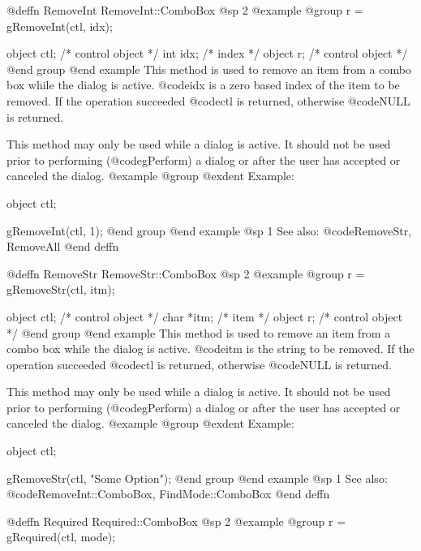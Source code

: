 {@deffn {RemoveInt} RemoveInt::ComboBox
@sp 2
@example
@group
r = gRemoveInt(ctl, idx);

object  ctl;    /*  control object  */
int     idx;    /*  index           */
object  r;      /*  control object  */
@end group
@end example
This method is used to remove an item from a combo box while the dialog
is active.  @code{idx} is a zero based index of the item to be removed.
If the operation succeeded @code{ctl} is returned, otherwise @code{NULL}
is returned.

This method may only be used while a dialog is active.  It should not be
used prior to performing (@code{gPerform}) a dialog or after the user
has accepted or canceled the dialog.
@example
@group
@exdent Example:

object  ctl;

gRemoveInt(ctl, 1);
@end group
@end example
@sp 1
See also:  @code{RemoveStr, RemoveAll}
@end deffn














@deffn {RemoveStr} RemoveStr::ComboBox
@sp 2
@example
@group
r = gRemoveStr(ctl, itm);

object  ctl;    /*  control object  */
char   *itm;    /*  item            */
object  r;      /*  control object  */
@end group
@end example
This method is used to remove an item from a combo box while the dialog
is active.  @code{itm} is the string to be removed.
If the operation succeeded @code{ctl} is returned, otherwise @code{NULL}
is returned.

This method may only be used while a dialog is active.  It should not be
used prior to performing (@code{gPerform}) a dialog or after the user
has accepted or canceled the dialog.
@example
@group
@exdent Example:

object  ctl;

gRemoveStr(ctl, "Some Option");
@end group
@end example
@sp 1
See also:  @code{RemoveInt::ComboBox, FindMode::ComboBox}
@end deffn

















@deffn {Required} Required::ComboBox
@sp 2
@example
@group
r = gRequired(ctl, mode);

}
